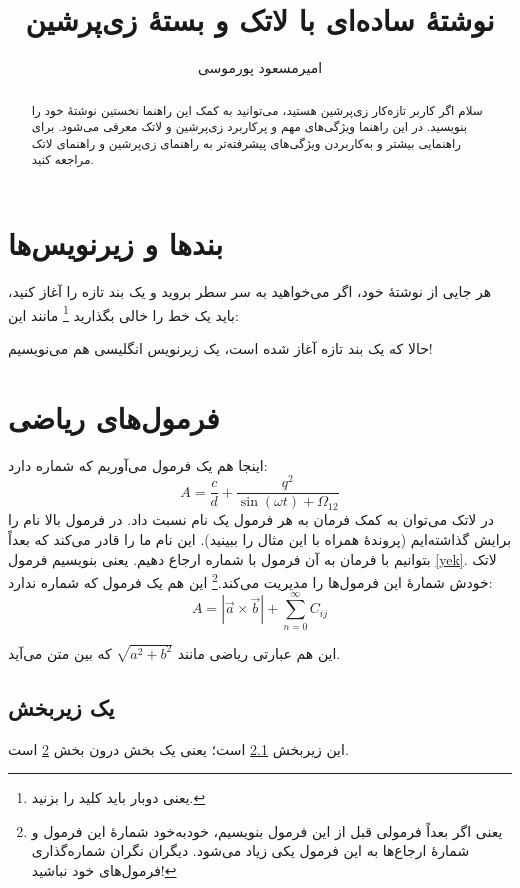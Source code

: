 \documentclass{article}
\title{نوشتهٔ ساده‌ای با لاتک و بستهٔ زی‌پرشین}
\author{امیرمسعود پورموسی
\\ \small\lr{http://www.parsilatex.com}
}
\begin{document}
\maketitle

\begin{abstract}
سلام اگر کاربر تازه‌کار زی‌پرشین هستید، می‌توانید به کمک این راهنما نخستین نوشتهٔ خود را بنویسید. در این راهنما ویژگی‌های مهم و پرکاربرد زی‌پرشین و لاتک معرفی می‌شود. برای راهنمایی بیشتر و به‌کاربردن ویژگی‌های پیشرفته‌تر به راهنمای زی‌پرشین و راهنمای لاتک مراجعه کنید.
\end{abstract}
\section{بندها و زیرنویس‌ها}
هر جایی از نوشتهٔ خود، اگر می‌خواهید به سر سطر بروید و یک بند تازه را آغاز کنید، باید یک خط را خالی بگذارید
\footnote{یعنی دوبار باید کلید  را بزنید.}
 مانند این:

حالا که یک بند تازه آغاز شده است، یک زیرنویس انگلیسی
 هم می‌نویسیم!
\section{فرمول‌های ریاضی}\label{formula}

اینجا هم یک فرمول می‌آوریم که شماره دارد:
\begin{equation}\label{yek}
A=\frac{c}{d}+\frac{q^2}{\sin(\omega t)+\Omega_{12}}
\end{equation}
در لاتک می‌توان به کمک فرمان 
به هر فرمول یک نام نسبت داد. در فرمول بالا نام  را برایش گذاشته‌ایم (پروندهٔ  همراه با این مثال را ببینید). این نام ما را قادر می‌کند که بعداً بتوانیم با فرمان
به آن فرمول با شماره ارجاع دهیم. یعنی بنویسیم فرمول \ref{yek}. 
لاتک خودش شمارهٔ این فرمول‌ها را مدیریت می‌کند.\footnote{یعنی اگر بعداً فرمولی قبل از این فرمول بنویسیم، خودبه‌خود شمارهٔ این فرمول و شمارهٔ ارجاع‌ها به این فرمول یکی زیاد می‌شود. دیگران نگران شماره‌گذاری فرمول‌های خود نباشید!} این هم یک فرمول که شماره ندارد:
$$A=|\vec{a}\times \vec{b}| + \sum_{n=0}^\infty C_{ij}$$

این هم عبارتی ریاضی مانند 
$\sqrt{a^2+b^2}$
 که بین متن می‌آید.
\subsection{یک زیربخش}\label{zirbakhsh}

این زیربخش \ref{zirbakhsh} است؛ یعنی یک بخش درون بخش \ref{formula} است.
\end{document}
